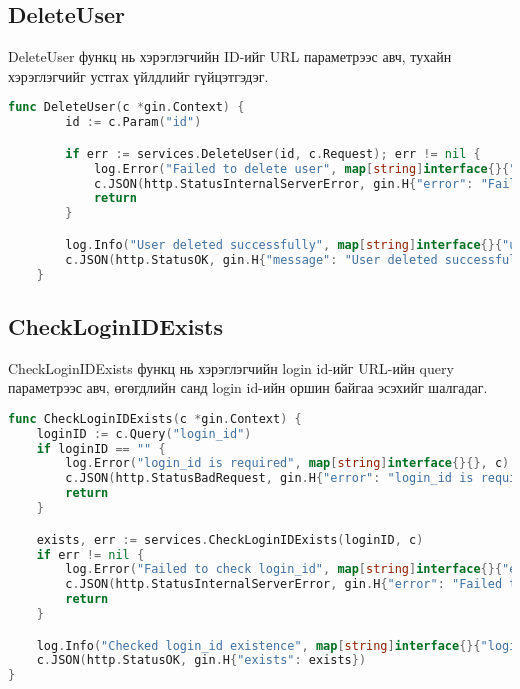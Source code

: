 \subsection{DeleteUser}
DeleteUser функц нь хэрэглэгчийн ID-ийг URL параметрээс авч, тухайн хэрэглэгчийг устгах үйлдлийг гүйцэтгэдэг.
\begin{lstlisting}[language=Go, caption=DeleteUser Controller, frame=single]
	func DeleteUser(c *gin.Context) {
		id := c.Param("id")

		if err := services.DeleteUser(id, c.Request); err != nil {
			log.Error("Failed to delete user", map[string]interface{}{"userID": id, "error": err.Error()}, c)
			c.JSON(http.StatusInternalServerError, gin.H{"error": "Failed to delete user"})
			return
		}

		log.Info("User deleted successfully", map[string]interface{}{"userID": id}, c)
		c.JSON(http.StatusOK, gin.H{"message": "User deleted successfully"})
	}
\end{lstlisting}

\subsection{CheckLoginIDExists}
CheckLoginIDExists функц нь хэрэглэгчийн login id-ийг URL-ийн query параметрээс авч, өгөгдлийн санд login id-ийн оршин байгаа эсэхийг шалгадаг.
\begin{lstlisting}[language=Go, caption=CheckLoginIDExists Controller, frame=single]
func CheckLoginIDExists(c *gin.Context) {
	loginID := c.Query("login_id")
	if loginID == "" {
		log.Error("login_id is required", map[string]interface{}{}, c)
		c.JSON(http.StatusBadRequest, gin.H{"error": "login_id is required"})
		return
	}

	exists, err := services.CheckLoginIDExists(loginID, c)
	if err != nil {
		log.Error("Failed to check login_id", map[string]interface{}{"error": err.Error()}, c)
		c.JSON(http.StatusInternalServerError, gin.H{"error": "Failed to check login_id"})
		return
	}

	log.Info("Checked login_id existence", map[string]interface{}{"login_id": loginID, "exists": exists}, c)
	c.JSON(http.StatusOK, gin.H{"exists": exists})
}

\end{lstlisting}
